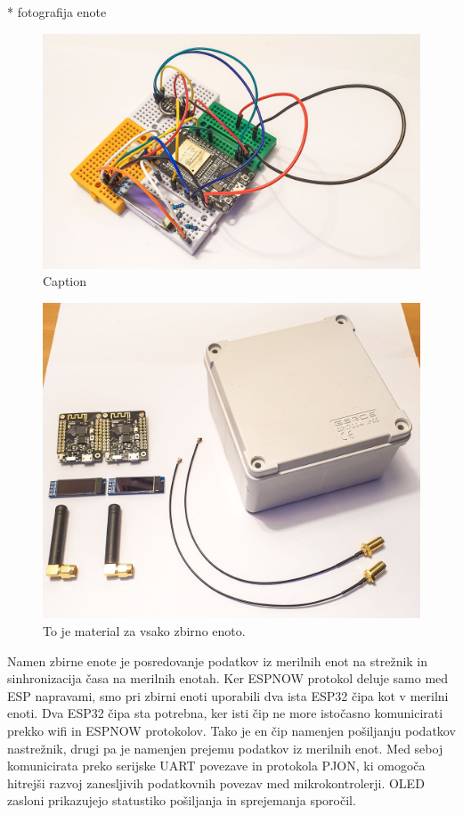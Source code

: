 \documentclass[a4paper, 12pt]{book}
\begin{document}
* fotografija enote
\begin{figure}[H]
    \centering
    \includegraphics[width=\linewidth]{slikovno_gradivo/prototip_1.jpg}
    \caption{Caption}
    \label{fig:INMP441}
\end{figure}



\begin{figure}[H]
    \centering
    \includegraphics[width=\linewidth]{slikovno_gradivo/zbirna _enota_1.jpg}
    \caption{To je material za vsako zbirno enoto.}
    \label{fig:material_zbirna}
\end{figure}

Namen zbirne enote je posredovanje podatkov iz merilnih enot na strežnik in sinhronizacija časa na merilnih enotah. 
Ker ESPNOW protokol deluje samo med ESP napravami, smo pri zbirni enoti uporabili dva ista ESP32 čipa kot v merilni enoti.
Dva ESP32 čipa sta potrebna, ker isti čip ne more istočasno komunicirati prekko wifi in ESPNOW protokolov. Tako je en čip namenjen pošiljanju podatkov nastrežnik, drugi pa je namenjen prejemu podatkov iz merilnih enot. Med seboj komunicirata preko serijske UART povezave in protokola PJON, ki omogoča hitrejši razvoj zanesljivih podatkovnih povezav med mikrokontrolerji.
OLED zasloni prikazujejo statustiko pošiljanja in sprejemanja sporočil.
\end{document}
